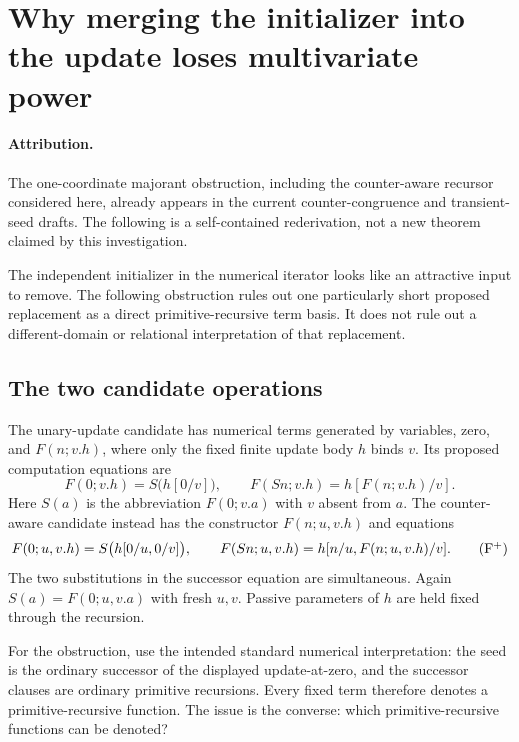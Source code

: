 \documentclass[11pt,letterpaper]{article}
\theoremstyle{definition}\newtheorem{definition}[theorem]{Definition}
\theoremstyle{remark}\newtheorem{remark}[theorem]{Remark}
\begin{document}
\clearpage
\section{Why merging the initializer into the update loses multivariate power}
\label{app:fused-seed-obstruction}

\paragraph{Attribution.} The one-coordinate majorant obstruction, including the counter-aware recursor considered here, already appears in the current counter-congruence and transient-seed drafts. The following is a self-contained rederivation, not a new theorem claimed by this investigation.~\cite{counter,transient}

The independent initializer in the numerical iterator looks like an
attractive input to remove.  The following obstruction rules out one
particularly short proposed replacement as a direct primitive-recursive
term basis.  It does not rule out a different-domain or relational
interpretation of that replacement.

\subsection{The two candidate operations}

The unary-update candidate has numerical terms generated by variables,
zero, and $F(n;v.h)$, where only the fixed finite update body $h$ binds
$v$.  Its proposed computation equations are
\[
 F(0;v.h)=S\bigl(h[0/v]\bigr),\qquad
 F(Sn;v.h)=h[F(n;v.h)/v].
 \tag{F}
\]
Here $S(a)$ is the abbreviation $F(0;v.a)$ with $v$ absent from $a$.
The counter-aware candidate instead has the constructor $F(n;u,v.h)$
and equations
\[
 F(0;u,v.h)=S\bigl(h[0/u,0/v]\bigr),\qquad
 F(Sn;u,v.h)=h[n/u,F(n;u,v.h)/v].
 \tag{F$^{+}$}
\]
The two substitutions in the successor equation are simultaneous.
Again $S(a)=F(0;u,v.a)$ with fresh $u,v$.  Passive parameters of $h$
are held fixed through the recursion.

For the obstruction, use the intended standard numerical interpretation:
the seed is the ordinary successor of the displayed update-at-zero, and
the successor clauses are ordinary primitive recursions.  Every fixed
term therefore denotes a primitive-recursive function.  The issue is the
converse: which primitive-recursive functions can be denoted?
\end{document}
